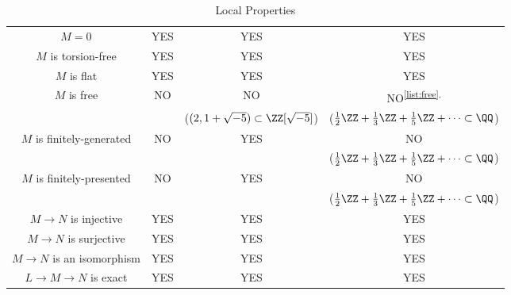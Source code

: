 \begin{table}
\begin{tabular}{c|ccc}
    $M=0$ & YES & YES & YES \\ 
    $M$ is torsion-free & YES & YES & YES \\
    $M$ is flat & YES & YES & YES \\
    $M$ is free & NO & NO & NO\textsuperscript{\ref{list:free}.}  \\
    & & {\footnotesize($(2,1+\sqrt{-5})\subset \ZZ[\sqrt{-5}]$)}
    & {\footnotesize{($\tfrac 12\ZZ + \tfrac 13\ZZ 
    + \tfrac 15\ZZ + \dots \subset\QQ$})}\\
    $M$ is finitely-generated & NO & YES & NO \\
    & & & {\footnotesize{($\tfrac 12\ZZ + \tfrac 13\ZZ 
    + \tfrac 15\ZZ + \dots \subset\QQ$})} \\
    $M$ is finitely-presented & NO & YES & NO \\
    & & & {\footnotesize{($\tfrac 12\ZZ + \tfrac 13\ZZ 
    + \tfrac 15\ZZ + \dots \subset\QQ$})} \\
    \hline 
    $M\to N$ is injective & YES & YES & YES \\ 
    $M\to N$ is surjective & YES & YES & YES \\ 
    $M\to N$ is an isomorphism & YES & YES & YES \\ 
    $L\to M\to N$ is exact  & YES & YES & YES \\ 
\end{tabular}
\caption{Local Properties}
\end{table}